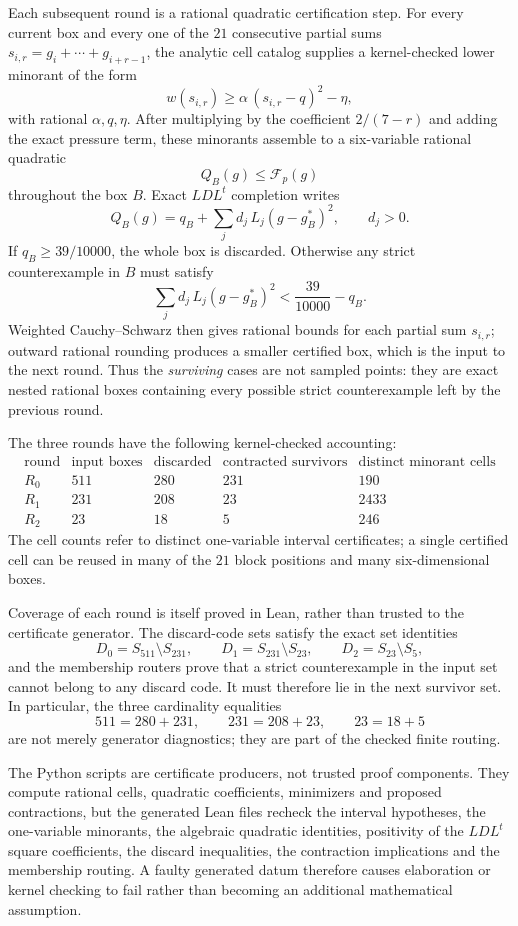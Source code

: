 \documentclass[11pt]{article}
\begin{document}
Each subsequent round is a rational quadratic certification step.  For every
current box and every one of the $21$ consecutive partial sums
$s_{i,r}=g_i+\cdots+g_{i+r-1}$, the analytic cell catalog supplies a
kernel-checked lower minorant of the form
\[
 w(s_{i,r})\ge
 \alpha\,(s_{i,r}-q)^2-\eta,
\]
with rational $\alpha,q,\eta$.  After multiplying by the coefficient
$2/(7-r)$ and adding the exact pressure term, these minorants assemble to a
six-variable rational quadratic
\[
 Q_B(g)\le\mathcal F_p(g)
\]
throughout the box $B$.  Exact $LDL^t$ completion writes
\[
 Q_B(g)=q_B+\sum_j d_j\,L_j(g-g_B^*)^2,
 \qquad d_j>0.
\]
If $q_B\ge39/10000$, the whole box is discarded.  Otherwise any strict
counterexample in $B$ must satisfy
\[
 \sum_j d_j\,L_j(g-g_B^*)^2
 <\frac{39}{10000}-q_B.
\]
Weighted Cauchy--Schwarz then gives rational bounds for each partial sum
$s_{i,r}$; outward rational rounding produces a smaller certified box, which
is the input to the next round.  Thus the \emph{surviving} cases are not
sampled points: they are exact nested rational boxes containing every possible
strict counterexample left by the previous round.

The three rounds have the following kernel-checked accounting:
\[
\begin{array}{c|r|r|r|r}
\text{round} & \text{input boxes} & \text{discarded}
 & \text{contracted survivors} & \text{distinct minorant cells}\\ \hline
R_0 & 511 & 280 & 231 & 190\\
R_1 & 231 & 208 & 23 & 2433\\
R_2 & 23 & 18 & 5 & 246
\end{array}
\]
The cell counts refer to distinct one-variable interval certificates; a
single certified cell can be reused in many of the $21$ block positions and
many six-dimensional boxes.

Coverage of each round is itself proved in Lean, rather than trusted to the
certificate generator.  The discard-code sets satisfy the exact set
identities
\[
 D_0=S_{511}\setminus S_{231},\qquad
 D_1=S_{231}\setminus S_{23},\qquad
 D_2=S_{23}\setminus S_5,
\]
and the membership routers prove that a strict counterexample in the input
set cannot belong to any discard code.  It must therefore lie in the next
survivor set.  In particular, the three cardinality equalities
\[
511=280+231,\qquad231=208+23,\qquad23=18+5
\]
are not merely generator diagnostics; they are part of the checked finite
routing.

The Python scripts are certificate producers, not trusted proof components.
They compute rational cells, quadratic coefficients, minimizers and proposed
contractions, but the generated Lean files recheck the interval hypotheses,
the one-variable minorants, the algebraic quadratic identities, positivity of
the $LDL^t$ square coefficients, the discard inequalities, the contraction
implications and the membership routing.  A faulty generated datum therefore
causes elaboration or kernel checking to fail rather than becoming an
additional mathematical assumption.
\end{document}
